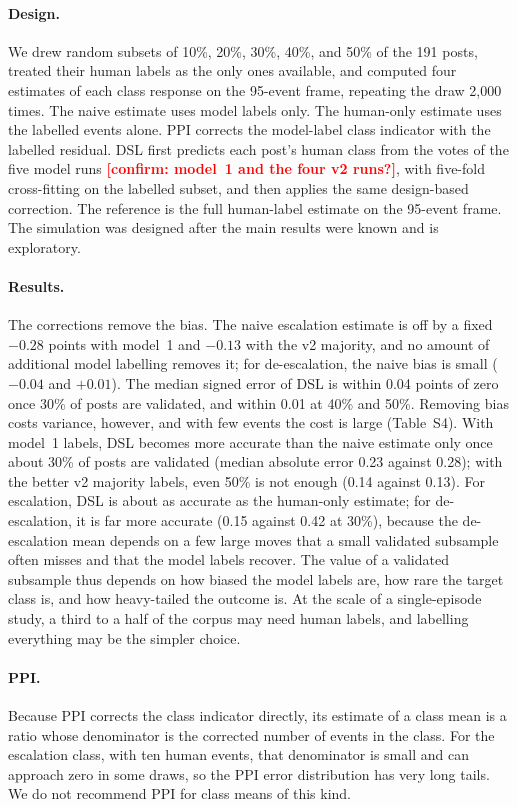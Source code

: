 \documentclass[11pt]{article}
\newcommand{\chk}[1]{\textcolor{red}{\textbf{[#1]}}}
\begin{document}
\paragraph{Design.} We drew random subsets of 10\%, 20\%, 30\%, 40\%, and 50\% of the 191 posts, treated their human labels as the only ones available, and computed four estimates of each class response on the 95-event frame, repeating the draw 2,000 times. The naive estimate uses model labels only. The human-only estimate uses the labelled events alone. PPI \citep{angelopoulos2023} corrects the model-label class indicator with the labelled residual. DSL \citep{egami2023} first predicts each post's human class from the votes of the five model runs \chk{confirm: model~1 and the four v2 runs?}, with five-fold cross-fitting on the labelled subset, and then applies the same design-based correction. The reference is the full human-label estimate on the 95-event frame. The simulation was designed after the main results were known and is exploratory.

\paragraph{Results.} The corrections remove the bias. The naive escalation estimate is off by a fixed $-0.28$ points with model~1 and $-0.13$ with the v2 majority, and no amount of additional model labelling removes it; for de-escalation, the naive bias is small ($-0.04$ and $+0.01$). The median signed error of DSL is within 0.04 points of zero once 30\% of posts are validated, and within 0.01 at 40\% and 50\%. Removing bias costs variance, however, and with few events the cost is large (Table~S4). With model~1 labels, DSL becomes more accurate than the naive estimate only once about 30\% of posts are validated (median absolute error 0.23 against 0.28); with the better v2 majority labels, even 50\% is not enough (0.14 against 0.13). For escalation, DSL is about as accurate as the human-only estimate; for de-escalation, it is far more accurate (0.15 against 0.42 at 30\%), because the de-escalation mean depends on a few large moves that a small validated subsample often misses and that the model labels recover. The value of a validated subsample thus depends on how biased the model labels are, how rare the target class is, and how heavy-tailed the outcome is. At the scale of a single-episode study, a third to a half of the corpus may need human labels, and labelling everything may be the simpler choice.

\paragraph{PPI.} Because PPI corrects the class indicator directly, its estimate of a class mean is a ratio whose denominator is the corrected number of events in the class. For the escalation class, with ten human events, that denominator is small and can approach zero in some draws, so the PPI error distribution has very long tails. We do not recommend PPI for class means of this kind.
\end{document}
